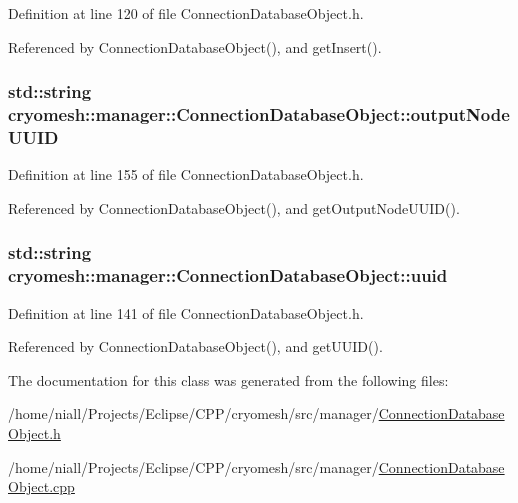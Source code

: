 \-Definition at line 120 of file \-Connection\-Database\-Object.\-h.



\-Referenced by \-Connection\-Database\-Object(), and get\-Insert().

\hypertarget{classcryomesh_1_1manager_1_1ConnectionDatabaseObject_a0b7a3185c6ef946c0afe806a364d13d5}{
\subsubsection[{output\-Node\-U\-U\-I\-D}]{\setlength{\rightskip}{0pt plus 5cm}std\-::string {\bf cryomesh\-::manager\-::\-Connection\-Database\-Object\-::output\-Node\-U\-U\-I\-D}}}\label{classcryomesh_1_1manager_1_1ConnectionDatabaseObject_a0b7a3185c6ef946c0afe806a364d13d5}


\-Definition at line 155 of file \-Connection\-Database\-Object.\-h.



\-Referenced by \-Connection\-Database\-Object(), and get\-Output\-Node\-U\-U\-I\-D().

\hypertarget{classcryomesh_1_1manager_1_1ConnectionDatabaseObject_a31eb0b099470e77da0a89c5cef9d6f68}{
\subsubsection[{uuid}]{\setlength{\rightskip}{0pt plus 5cm}std\-::string {\bf cryomesh\-::manager\-::\-Connection\-Database\-Object\-::uuid}}}\label{classcryomesh_1_1manager_1_1ConnectionDatabaseObject_a31eb0b099470e77da0a89c5cef9d6f68}


\-Definition at line 141 of file \-Connection\-Database\-Object.\-h.



\-Referenced by \-Connection\-Database\-Object(), and get\-U\-U\-I\-D().



\-The documentation for this class was generated from the following files\-:\begin{DoxyCompactItemize}
\item 
/home/niall/\-Projects/\-Eclipse/\-C\-P\-P/cryomesh/src/manager/\hyperlink{ConnectionDatabaseObject_8h}{\-Connection\-Database\-Object.\-h}\item 
/home/niall/\-Projects/\-Eclipse/\-C\-P\-P/cryomesh/src/manager/\hyperlink{ConnectionDatabaseObject_8cpp}{\-Connection\-Database\-Object.\-cpp}\end{DoxyCompactItemize}
